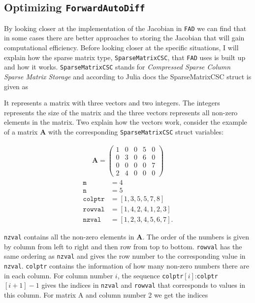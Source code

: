\subsection{Optimizing \texttt{ForwardAutoDiff}}
By looking closer at the implementation of the Jacobian in \texttt{FAD} we can find that in some cases there are better approaches to storing the Jacobian that will gain computational efficiency. Before looking closer at the specific situations, I will explain how the sparse matrix type, \texttt{SparseMatrixCSC}, that \texttt{FAD} uses is built up and how it works. \texttt{SparseMatrixCSC} stands for \textit{Compressed Sparse Column Sparse Matrix Storage} and according to Julia docs \emph{\citep{SparseMatrixCSC}} the SparseMatrixCSC struct is given as

It represents a matrix with three vectors and two integers. The integers represents the size of the matrix and the three vectors represents all non-zero elements in the matrix. Two explain how the vectors work, consider the example of a matrix \textbf{A} with the corresponding \texttt{SparseMatrixCSC} struct variables:
\begin{multicols}{2}
    \begin{align*}
        \textbf{A} = \begin{pmatrix}
        1&0&0&5&0\\
        0&3&0&6&0\\
        0&0&0&0&7\\
        2&4&0&0&0\end{pmatrix}
    \end{align*}
    \columnbreak
    \begin{align*}
        \texttt{m} &= 4\\
        \texttt{n} &= 5\\
        \texttt{colptr} &= [1, 3, 5, 5, 7, 8]\\
        \texttt{rowval} &= [1, 4, 2, 4, 1, 2, 3]\\
        \texttt{nzval} &= [1, 2, 3, 4, 5, 6, 7].
    \end{align*}
\end{multicols}
\texttt{nzval} contains all the non-zero elements in \textbf{A}. The order of the numbers is given by column from left to right and then row from top to bottom. \texttt{rowval} has the same ordering as \texttt{nzval} and gives the row number to the corresponding value in \texttt{nzval}. \texttt{colptr} contains the information of how many non-zero numbers there are in each column. For column number $i$, the sequence \texttt{colptr}$[i]$:\texttt{colptr}$[i+1]-1$ gives the indices in \texttt{nzval} and \texttt{rowval} that corresponds to values in this column. For matrix A and column number 2 we get the indices
